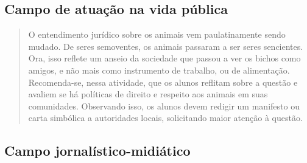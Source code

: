 \documentclass[11pt]{extarticle}
\begin{document}
\subsection{Campo de atuação na vida pública}

\begin{comment}
``No cerne do campo de atuação na vida pública estão a ampliação da
participação em diferentes instâncias da vida pública, a defesa dos direitos,
o domínio básico de textos legais e a discussão e o debate de ideias, propostas
e projetos. {[}...{]}

Ainda no domínio das ênfases, indica-se um conjunto de habilidades que se
relacionam com a análise, discussão, elaboração e desenvolvimento de propostas
de ação e de projetos culturais e de intervenção social.'' (BNCC, p. 494)
\end{comment}

\begin{quote} O entendimento jurídico sobre os animais vem paulatinamente sendo
  mudado. De seres semoventes, os animais passaram a ser seres sencientes.
  Ora, isso reflete um anseio da sociedade que passou a ver os bichos como
  amigos, e não mais como instrumento de trabalho, ou de alimentação.
  Recomenda-se, nessa atividade, que os alunos reflitam sobre a questão
  e avaliem se há políticas de direito e respeito aos animais em suas
  comunidades. Observando isso, os alunos devem redigir um manifesto ou carta
simbólica a autoridades locais, solicitando maior atenção à questão.
\end{quote}

\subsection{Campo jornalístico-midiático }
\end{document}
